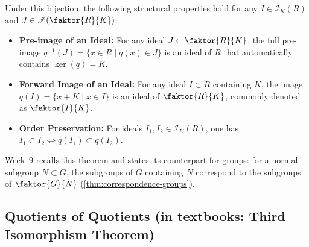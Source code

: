 \begin{content}

\begin{steps}
Under this bijection, the following structural properties hold for any $I \in \mathscr{I}_K(R)$ and $J \in \mathscr{I}(\faktor{R}{K})$:
\begin{itemize}
    \item \textbf{Pre-image of an Ideal:} For any ideal $J \subset \faktor{R}{K}$, the full pre-image $q^{-1}(J) = \{ x \in R \mid q(x) \in J \}$ is an ideal of $R$ that automatically contains $\ker(q) = K$.
    \item \textbf{Forward Image of an Ideal:} For any ideal $I \subset R$ containing $K$, the image $q(I) = \{ x + K \mid x \in I \}$ is an ideal of $\faktor{R}{K}$, commonly denoted as $\faktor{I}{K}$.
    \item \textbf{Order Preservation:} For ideals $I_1, I_2 \in \mathscr{I}_K(R)$, one has $I_1 \subset I_2 \iff q(I_1) \subset q(I_2)$.
\end{itemize}
\end{steps}

Week~9 recalls this theorem and states its counterpart for groups: for a normal subgroup $N \subset G$, the subgroups of $G$ containing $N$ correspond to the subgroups of $\faktor{G}{N}$ (\cref{thm:correspondence-groups}).
\end{content}

\subsection{Quotients of Quotients (in textbooks: Third Isomorphism Theorem)}

